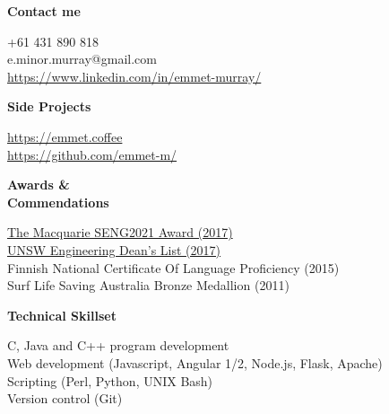 \documentclass[a4paper]{article}
\newcommand{\mytitle}[1]{{\Large \textbf{#1}} \vspace{0.2cm}}
\begin{document}
\begin{minipage}[t]{0.3\linewidth}
    {
        \mytitle{Contact me}
        
        +61 431 890 818 \\
        e.minor.murray@gmail.com \\
        \href{https://www.linkedin.com/in/emmet-murray/}{https://www.linkedin.com/in/emmet-murray/} 

    }
    \vspace{0.5cm}
    {
        \mytitle{Side Projects}
        
        \href{https://emmet.coffee}{https://emmet.coffee} \\
        \href{https://github.com/emmet-m/}{https://github.com/emmet-m/} 
        
    }
    \vspace{0.5cm}

    {
        \mytitle{Awards \&\\ Commendations}

        \href{https://www.engineering.unsw.edu.au/computer-science-engineering/computer-science-engineering/computer-science-engineering/computer-science-engineering/2017-winners}{The Macquarie SENG2021 Award (2017)} \\
        
        \href{https://www.engineering.unsw.edu.au/study-with-us/current-students/academic-information/awards-prizes/dean’s-honours-list/past-winners}{UNSW Engineering Dean's List (2017)} \\
        

        Finnish National Certificate Of Language Proficiency (2015) \\

        Surf Life Saving Australia Bronze Medallion (2011)
    }
    \vspace{0.5cm}
    
    {
        \mytitle{Technical Skillset}

        C, Java and C++ program development \\ 

        Web development (Javascript, Angular 1/2, Node.js, Flask, Apache) \\

        Scripting (Perl, Python, UNIX Bash) \\

        Version control (Git) \\

}
\end{minipage}
\end{document}
